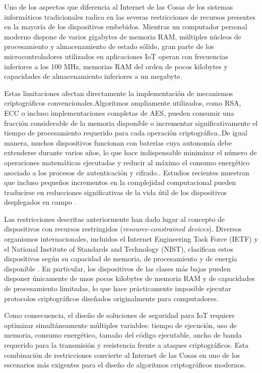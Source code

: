 Uno de los aspectos que diferencia al Internet de las Cosas de los sistemas informáticos tradicionales radica en las severas restricciones de recursos presentes en la mayoría de los  dispositivos embebidos. Mientras un computador personal moderno dispone de varios gigabytes de memoria RAM, múltiples núcleos de procesamiento y almacenamiento de estado sólido, gran parte de los microcontroladores utilizados en aplicaciones IoT operan con frecuencias inferiores a los 100 MHz, memorias RAM del orden de pocos kilobytes y capacidades de almacenamiento inferiores a un megabyte.

Estas limitaciones afectan directamente la implementación de mecanismos criptográficos convencionales.Algoritmos ampliamente utilizados, como RSA, ECC o incluso implementaciones completas de AES, pueden consumir una fracción considerable de la memoria disponible o incrementar significativamente el tiempo de procesamiento requerido para cada operación criptográfica..De igual manera, muchos dispositivos funcionan con baterías cuya autonomía debe extenderse durante varios años, lo que hace indispensable minimizar el número de operaciones matemáticas ejecutadas y reducir al máximo el consumo energético asociado a los procesos de autenticación y cifrado.. Estudios recientes muestran que incluso pequeños incrementos en la complejidad computacional pueden traducirse en reducciones significativas de la vida útil de los dispositivos desplegados en campo \cite{Radhakrishnan2024EfficiencyDevices}.

Las restricciones descritas anteriormente han dado lugar al concepto de dispositivos con recursos restringidos (\textit{resource-constrained devices}). Diversos organismos internacionales, incluidos el Internet Engineering Task Force (IETF) y el National Institute of Standards and Technology (NIST), clasifican estos dispositivos según su capacidad de memoria, de procesamiento y de energía disponible \cite{McKay2017ReportCryptography}. En particular, los dispositivos de las clases más bajas pueden disponer únicamente de unos pocos kilobytes de memoria RAM y de capacidades de procesamiento limitadas, lo que hace prácticamente imposible ejecutar protocolos criptográficos diseñados originalmente para computadores.

Como consecuencia, el diseño de soluciones de seguridad para IoT requiere optimizar simultáneamente múltiples variables: tiempo de ejecución, uso de memoria, consumo energético, tamaño del código ejecutable, ancho de banda requerido para la transmisión y resistencia frente a ataques criptográficos. Esta combinación de restricciones convierte al Internet de las Cosas en uno de los escenarios más exigentes para el diseño de algoritmos criptográficos modernos.

